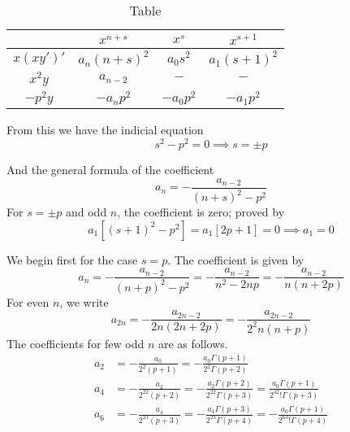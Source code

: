 \documentclass[../../../main.tex]{subfiles}
\begin{document}
\begin{table}[h]
    \centering
    \caption{Table}
    \begin{tabular}{cccc }
        \toprule
                  & $x^{n+s}$     & $x^s$     & $x^{s+1}$    \\
        \midrule
        $x(xy')'$ & $a_n(n+s)^2 $ & $a_0s^2$  & $a_1(s+1)^2$ \\
        $x^2y $   & $a_{n-2}$     & $- $      & $-$          \\
        $-p^2y$   & $-a_np^2$     & $-a_0p^2$ & $-a_1p^2$    \\
        \bottomrule
    \end{tabular}
\end{table}

From this we have the indicial equation
\begin{equation*}
    s^2-p^2=0\implies s=\pm p
\end{equation*}

And the general formula of the coefficient
\begin{equation*}
    a_n=-\frac{a_{n-2}}{(n+s)^2-p^2}
\end{equation*}
For $s=\pm p$ and odd $n$, the coefficient is zero; proved by
\begin{equation*}
    a_1\left[(s+1)^2-p^2\right]=a_1\left[2p+1\right]=0\implies a_1=0
\end{equation*}

We begin first for the case $s=p$.
The coefficient is given by
\begin{equation*}
    a_n=-\frac{a_{n-2}}{(n+p)^2-p^2}=-\frac{a_{n-2}}{n^2-2np}=-\frac{a_{n-2}}{n(n+2p)}
\end{equation*}
For even $n$, we write
\begin{equation*}
    a_{2n}=-\frac{a_{2n-2}}{2n(2n+2p)}= -\frac{a_{2n-2}}{2^2n(n+p)}
\end{equation*}
The coefficients for few odd $n$ are as follows.
\begin{align*}
    a_2 & =-\frac{a_0}{2^2(p+1)}=-\frac{a_0\Gamma(p+1)}{2^2\Gamma(p+2)}                                            \\
    a_4 & =-\frac{a_2}{2^22(p+2)}=-\frac{a_2\Gamma(p+2)}{2^22\Gamma(p+3)}=\frac{a_0\Gamma(p+1)}{2^42!\Gamma(p+3)}  \\
    a_6 & =-\frac{a_4}{2^23(p+3)}=-\frac{a_4\Gamma(p+3)}{2^23\Gamma(p+4)}=-\frac{a_0\Gamma(p+1)}{2^63!\Gamma(p+4)}
\end{align*}
\end{document}
